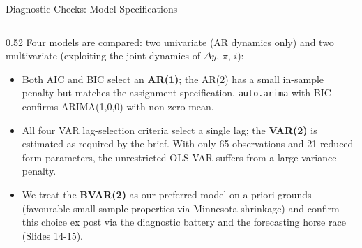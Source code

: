 \documentclass[9pt]{beamer}
\begin{document}
\begin{frame}{Diagnostic Checks: Model Specifications}
\begin{columns}
  \begin{column}{0.52\textwidth}
    \footnotesize
    Four models are compared: two univariate (AR dynamics only) and two multivariate (exploiting the joint dynamics of $\Delta y$, $\pi$, $i$):
    \begin{itemize}
      \item Both AIC and BIC select an \textbf{AR(1)}; the AR(2) has a small in-sample penalty but matches the assignment specification. \texttt{auto.arima} with BIC confirms ARIMA(1,0,0) with non-zero mean.

      \item All four VAR lag-selection criteria select a single lag; the \textbf{VAR(2)} is estimated as required by the brief. With only 65 observations and 21 reduced-form parameters, the unrestricted OLS VAR suffers from a large variance penalty.

      \item We treat the \textbf{BVAR(2)} as our preferred model on a priori grounds (favourable small-sample properties via Minnesota shrinkage) and confirm this choice ex post via the diagnostic battery and the forecasting horse race (Slides 14-15).
    \end{itemize}
  \end{column}
\end{columns}

\end{frame}
\end{document}
